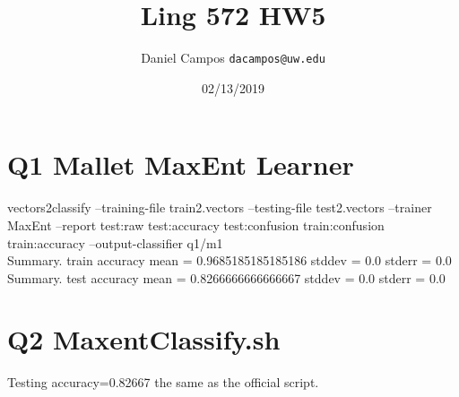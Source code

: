 \documentclass[11pt]{article}
\begin{document}
\title{Ling 572 HW5 }
\author{Daniel Campos  \tt {dacampos@uw.edu}}
\date{02/13/2019}
\maketitle 
\section{Q1 Mallet MaxEnt Learner}
vectors2classify --training-file train2.vectors --testing-file test2.vectors --trainer MaxEnt --report test:raw test:accuracy test:confusion train:confusion train:accuracy --output-classifier q1/m1 \\
Summary. train accuracy mean = 0.9685185185185186 stddev = 0.0 stderr = 0.0 \\
Summary. test accuracy mean = 0.8266666666666667 stddev = 0.0 stderr = 0.0 \\
\section{Q2 MaxentClassify.sh}
Testing accuracy=0.82667 the same as the official script.
\end{document}
